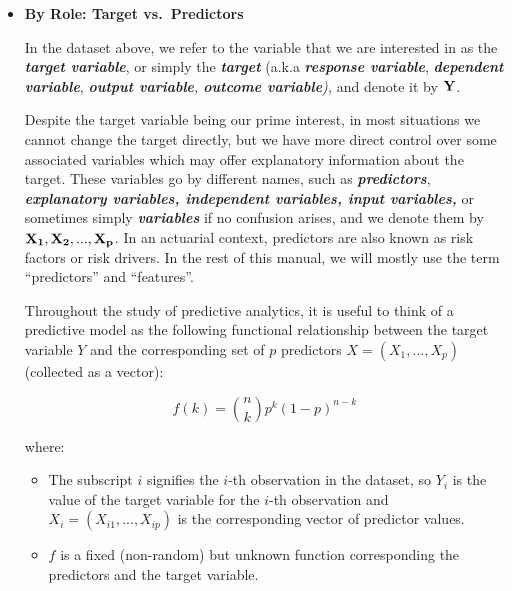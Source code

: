 \documentclass[
  10pt,
]{krantz}
\providecommand{\tightlist}{%
  \setlength{\itemsep}{0pt}\setlength{\parskip}{0pt}}
\begin{document}
\begin{itemize}
\item
  \textbf{By Role: Target vs.~Predictors}

  In the dataset above, we refer to the variable that we are interested in as
  the \textbf{\emph{target variable}}, or simply the \textbf{\emph{target}} (a.k.a \textbf{\emph{response
  variable}}, \textbf{\emph{dependent variable}}, \emph{\textbf{output variable}, \textbf{outcome
  variable}),} and denote it by \(\bf{Y}\).

  Despite the target variable being our prime interest, in most situations we
  cannot change the target directly, but we have more direct control over some
  associated variables which may offer explanatory information about the
  target. These variables go by different names, such as \textbf{\emph{predictors}},
  \textbf{\emph{explanatory variables, independent variables, input variables,}} or
  sometimes simply \textbf{\emph{variables}} if no confusion arises, and we denote them
  by \(\bf{X_1, X_2, ..., X_p}\). In an actuarial context, predictors are also
  known as risk factors or risk drivers. In the rest of this manual, we will
  mostly use the term ``predictors'' and ``features''.

  Throughout the study of predictive analytics, it is useful to think of a
  predictive model as the following functional relationship between the target
  variable \(Y\) and the corresponding set of \(p\) predictors \(X=(X_1,...,X_p)\)
  (collected as a vector):

  \[
  \begin{equation}   f\left(k\right) = \binom{n}{k} p^k\left(1-p\right)^{n-k}  \label{eq:binom}\end{equation} 
  \]

  where:

  \begin{itemize}
  \tightlist
  \item
    The subscript \(i\) signifies the \(i\)-th observation in the dataset, so
    \(Y_i\) is the value of the target variable for the \(i\)-th observation and
    \(X_i = (X_{i1}, ..., X_{ip})\) is the corresponding vector of predictor
    values.
  \item
    \(f\) is a fixed (non-random) but unknown function corresponding the
    predictors and the target variable.


\end{itemize}
\end{itemize}
\end{document}
